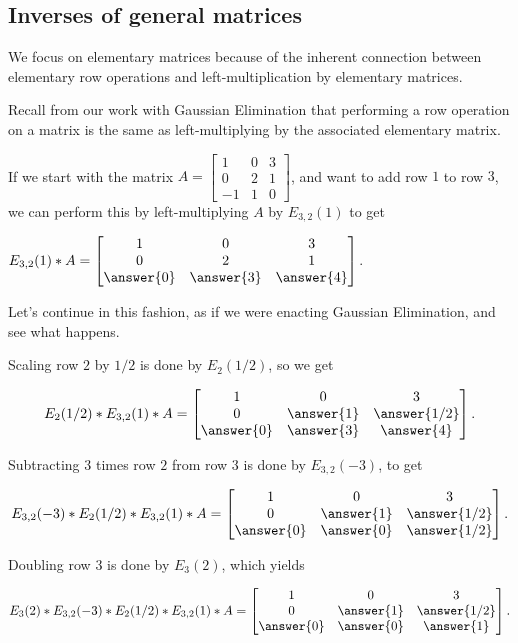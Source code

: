 \documentclass{ximera}
\begin{document}
\subsection*{Inverses of general matrices}

We focus on elementary matrices because of the inherent connection between elementary row operations and left-multiplication by elementary matrices. 

\begin{example}
Recall from our work with Gaussian Elimination that performing a row operation on a matrix is the same as left-multiplying by the associated elementary matrix.

If we start with the matrix $A=\begin{bmatrix}
  1&0&3\\0&2&1\\-1&1&0
\end{bmatrix}$, and want to add row $1$ to row $3$, we can perform this by left-multiplying $A$ by $E_{3,2}(1)$ to get

$E_{3,2}(1)*A=\begin{bmatrix}
1&0&3\\0&2&1\\\answer{0}&\answer{3}&\answer{4}
\end{bmatrix}$.

Let's continue in this fashion, as if we were enacting Gaussian Elimination, and see what happens.

Scaling row $2$ by $1/2$ is done by $E_{2}(1/2)$, so we get

$$E_{2}(1/2)*E_{3,2}(1)*A=\begin{bmatrix}
  1&0&3\\0&\answer{1}&\answer{1/2}\\\answer{0}&\answer{3}&\answer{4}
  \end{bmatrix}.$$

Subtracting $3$ times row $2$ from row $3$ is done by $E_{3,2}(-3)$, to get

$$E_{3,2}(-3)*E_{2}(1/2)*E_{3,2}(1)*A=\begin{bmatrix}
  1&0&3\\0&\answer{1}&\answer{1/2}\\\answer{0}&\answer{0}&\answer{1/2}
  \end{bmatrix}.$$

Doubling row $3$ is done by $E_{3}(2)$, which yields

$$E_{3}(2)*E_{3,2}(-3)*E_{2}(1/2)*E_{3,2}(1)*A=\begin{bmatrix}
  1&0&3\\0&\answer{1}&\answer{1/2}\\\answer{0}&\answer{0}&\answer{1}
  \end{bmatrix}.$$


\end{example}
\end{document}
